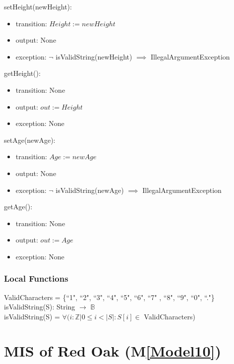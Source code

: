 \documentclass[12pt, titlepage]{article}
\newcommand{\mref}[1]{M\ref{#1}}
\begin{document}
\noindent setHeight(newHeight):
\begin{itemize}
\item transition: $\mathit{Height := newHeight}$
\item output: None
\item exception: $\neg$ isValidString(newHeight) $\implies$
IllegalArgumentException
\end{itemize}

\noindent getHeight():
\begin{itemize}
\item transition: None
\item output: $\mathit{out := Height}$
\item exception: None
\end{itemize}

\noindent setAge(newAge):
\begin{itemize}
\item transition: $\mathit{Age := newAge}$
\item output: None
\item exception: $\neg$ isValidString(newAge) $\implies$
IllegalArgumentException
\end{itemize}

\noindent getAge():
\begin{itemize}
\item transition: None
\item output: $\mathit{out := Age}$
\item exception: None
\end{itemize}

\subsubsection{Local Functions}
ValidCharacters = \{``1", ``2", ``3", ``4", ``5", ``6", ``7"
, ``8", ``9", ``0", ``."\}\\

\noindent isValidString(S): String $\rightarrow$ $\mathbb{B}$ \\

\noindent isValidString(S) = $\forall(i : \mathbb{Z} | 0 \leq
i < |S| : S[i] \in $ ValidCharacters)

\newpage

\renewcommand{\tn}{Red Oak }
\renewcommand{\tmn}{RedOak}
\renewcommand{\constn}{Red\ Oak}

\section{MIS of \tn (\mref{Model10})}
\end{document}
